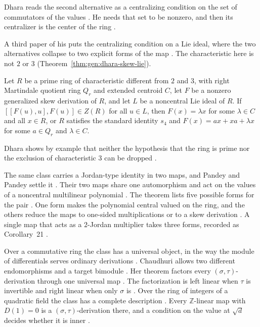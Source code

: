 Dhara reads the second alternative as a centralizing condition on the set of
commutators of the values \cite[Corollary~1.2, p.~3]{Dhara2019Quaest}. He
needs that set to be nonzero, and then its centralizer is the center of the
ring \cite[Corollary~1.2, p.~3]{Dhara2019Quaest}.

A third paper of his puts the centralizing condition on a Lie ideal, where the
two alternatives collapse to two explicit forms of the map
\cite[p.~1]{Dhara2019Ferrara}. The characteristic here is not $2$ or $3$
(Theorem~\ref{thm:gen:dhara-skew-lie}).

\begin{theorem}\label{thm:gen:dhara-skew-lie}
Let $R$ be a prime ring of characteristic different from $2$ and $3$, with right
Martindale quotient ring $Q_{r}$ and extended centroid $C$, let $F$ be a nonzero
generalized skew derivation of $R$, and let $L$ be a noncentral Lie ideal of $R$.
If $[[F(u),u],F(u)]\in Z(R)$ for all $u\in L$, then $F(x)=\lambda x$ for some
$\lambda\in C$ and all $x\in R$, or $R$ satisfies the standard identity $s_{4}$ and
$F(x)=ax+xa+\lambda x$ for some $a\in Q_{r}$ and $\lambda\in C$.
\end{theorem}

Dhara shows by example that neither the hypothesis that the ring is prime nor
the exclusion of characteristic $3$ can be dropped
\cite[p.~1]{Dhara2019Ferrara}.

The same class carries a Jordan-type identity in two maps, and Pandey and
Pandey settle it \cite[p.~3]{PandeyPandey2023bGeneralized}. Their two maps
share one automorphism and act on the values of a noncentral multilinear
polynomial \cite[Theorem~6, pp.~3--4]{PandeyPandey2023bGeneralized}. The
theorem lists five possible forms for the pair \cite[Theorem~6,
pp.~3--4]{PandeyPandey2023bGeneralized}. One form makes the polynomial central
valued on the ring, and the others reduce the maps to one-sided
multiplications or to a skew derivation \cite[Theorem~6,
pp.~3--4]{PandeyPandey2023bGeneralized}. A single map that acts as a
$2$-Jordan multiplier takes three forms, recorded as Corollary~21
\cite[Corollary~21, p.~18]{PandeyPandey2023bGeneralized}.

Over a commutative ring the class has a universal object, in the way the
module of differentials serves ordinary derivations
\cite[p.~3]{Chaudhuri2020SigmaTau}. Chaudhuri allows two different
endomorphisms and a target bimodule \cite[p.~2]{Chaudhuri2020SigmaTau}. Her
theorem factors every $(\sigma,\tau)$-derivation through one universal map
\cite[Theorem~3.1, p.~3]{Chaudhuri2020SigmaTau}. The factorization is left
linear when $\tau$ is invertible and right linear when only $\sigma$ is
\cite[Theorem~3.1, p.~3]{Chaudhuri2020SigmaTau}. Over the ring of integers of
a quadratic field the class has a complete description \cite[Theorem~4.2,
pp.~6--7]{Chaudhuri2020SigmaTau}. Every $\mathbb{Z}$-linear map with $D(1)=0$
is a $(\sigma,\tau)$-derivation there, and a condition on the value at
$\sqrt{d}$ decides whether it is inner \cite[Theorem~4.2,
pp.~6--7]{Chaudhuri2020SigmaTau}.


